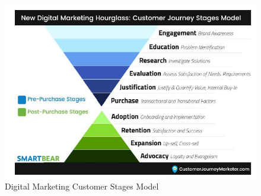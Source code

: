 \documentclass[sigconf]{acmart}
\begin{document}
\begin{figure}[ht!]
  \centering\includegraphics[width=\columnwidth]{digitalmarketing.jpg}
  \caption{Digital Marketing Customer Stages Model}\label{f:Digital Marketing}
\end{figure}
\end{document}
